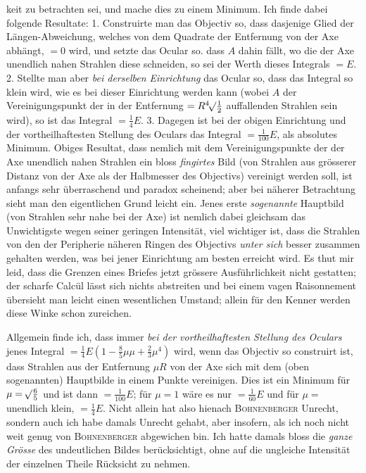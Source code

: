 \noindent keit zu betrachten sei, und mache dies zu einem Minimum. Ich finde dabei folgende Resultate: 1. Construirte man das Objectiv so, dass dasjenige Glied der Längen-Abweichung, welches von dem Quadrate der Entfernung von der Axe abhängt, $=0$ wird, und setzte das Ocular so. dass $A$ dahin fällt, wo die der Axe unendlich nahen Strahlen diese schneiden, so sei der Werth dieses Integrals $=E$. 2. Stellte man aber \textit{bei derselben Einrichtung} das Ocular so, dass das Integral so klein wird, wie es bei dieser Einrichtung werden kann (wobei $A$ der Vereinigungspunkt der in der Entfernung $=R\BareRoot[4]{\tfrac12}$ auffallenden Strahlen sein wird), so ist das Integral $=\tfrac14E$. 3. Dagegen ist bei der obigen Einrichtung und der vortheilhaftesten Stellung des Oculars das Integral $=\tfrac{1}{100}E$, als absolutes Minimum. Obiges Resultat, dass nemlich mit dem Vereinigungspunkte der der Axe unendlich nahen Strahlen ein bloss \textit{fingirtes} Bild (von Strahlen aus grösserer Distanz von der Axe als der Halbmesser des Objectivs) vereinigt werden soll, ist anfangs sehr überraschend und paradox scheinend; aber bei näherer Betrachtung sieht man den eigentlichen Grund leicht ein. Jenes erste \textit{sogenannte} Hauptbild (von Strahlen sehr nahe bei der Axe) ist nemlich dabei gleichsam das Unwichtigste wegen seiner geringen Intensität, viel wichtiger ist, dass die Strahlen von den der Peripherie näheren Ringen des Objectivs \textit{unter sich} besser zusammen gehalten werden, was bei jener Einrichtung am besten erreicht wird. Es thut mir leid, dass die Grenzen eines Briefes jetzt grössere Ausführlichkeit nicht gestatten; der scharfe Calcül lässt sich nichts abstreiten und bei einem vagen Raisonnement übersieht man leicht einen wesentlichen Umstand; allein für den Kenner werden diese Winke schon zureichen.

Allgemein finde ich, dass immer \textit{bei der vortheilhaftesten Stellung des Oculars} jenes Integral $=\tfrac14E(1-\tfrac85\mu\mu+\tfrac23\mu^4)$ wird, wenn das Objectiv so construirt ist, dass Strahlen aus der Entfernung $\mu R$ von der Axe sich mit dem (oben sogenannten) Hauptbilde in einem Punkte vereinigen. Dies ist ein Minimum für $\mu=\BareRoot{\tfrac65}$ und ist dann $=\tfrac{1}{100}E$; für $\mu=1$ wäre es nur $=\tfrac{1}{60}E$ und für $\mu=$ unendlich klein, $=\tfrac14E$. Nicht allein hat also hienach \textsc{Bohnenberger} Unrecht, sondern auch ich habe damals Unrecht gehabt, aber insofern, als ich noch nicht weit genug von \textsc{Bohnenberger} abgewichen bin. Ich hatte damals bloss die \textit{ganze Grösse} des undeutlichen Bildes berücksichtigt, ohne auf die ungleiche Intensität der einzelnen Theile Rücksicht zu nehmen.

